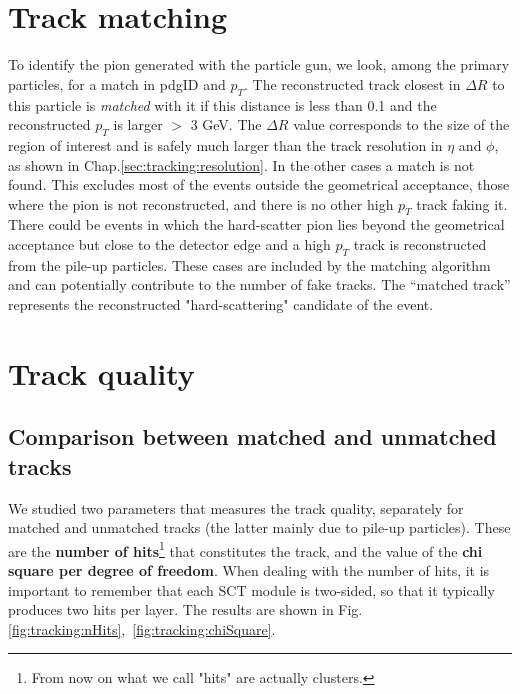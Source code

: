 \documentclass[a4paper,twoside,12pt]{book}
\begin{document}
\section{Track matching}\label{subsec:tracking:matching}
To identify the pion generated with the particle gun, we look, among the primary particles, for a match in pdgID and $p_{T}$. The
reconstructed track closest in $\Delta R$ to this particle is \textit{matched} with it if this distance is less than 0.1 and the reconstructed $p_{T}$ is 
larger $>$ 3 GeV. The $\Delta R$ value corresponds to the size of the 
region of interest and is safely much larger than the track resolution in $\eta$ and $\phi$, as shown in Chap.\ref{sec:tracking:resolution}. In the other cases a match
is not found. This excludes most of the events outside the geometrical acceptance, those where the pion is not reconstructed, and there is no other 
high $p_{T}$ track faking it. There could be events in which the hard-scatter pion lies beyond the geometrical acceptance but close to the detector edge 
and a high $p_{T}$ track is reconstructed from the pile-up particles. These cases are included by the matching algorithm and can potentially contribute
to the number of fake tracks. The ``matched track''
represents the reconstructed "hard-scattering" candidate of the event.  

\section{Track quality}\label{subsec:tracking:quality}

\subsection{Comparison between matched and unmatched tracks}

We studied two parameters that measures the track quality, separately for matched and unmatched tracks (the latter mainly due to pile-up particles). These
are the \textbf{number of hits}\footnote{From now on what we call "hits" are actually clusters.} that constitutes the track, and the value of the \textbf{chi square per degree of freedom}. When dealing with the number
of hits, it is important to remember that each SCT module is two-sided, so that it typically produces two hits per layer. The results are shown in \mbox{Fig.\ref{fig:tracking:nHits}, \ref{fig:tracking:chiSquare}}. \\
\end{document}
